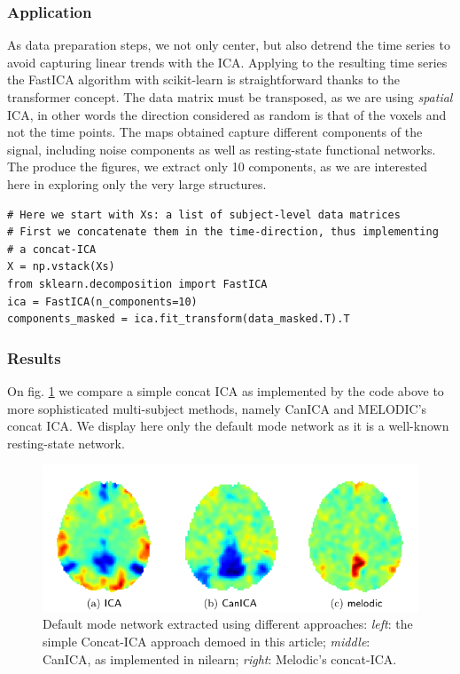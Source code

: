 \documentclass{frontiersSCNS} %
\begin{document}
\subsubsection{Application}

As data preparation steps, we not only center, but also detrend the time
series to avoid capturing linear trends with the ICA. Applying to the
resulting time series the FastICA algorithm with scikit-learn is
straightforward thanks to the transformer concept. The data matrix must
be transposed, as we are using \emph{spatial} ICA, in other words the
direction considered as random is that of the voxels and not the time
points. The maps obtained capture different components of the signal,
including noise components as well as resting-state functional networks.
The produce the figures, we extract only 10 components, as we are
interested here in exploring only the very large structures.

\begin{lstlisting}
# Here we start with Xs: a list of subject-level data matrices
# First we concatenate them in the time-direction, thus implementing
# a concat-ICA
X = np.vstack(Xs)
from sklearn.decomposition import FastICA
ica = FastICA(n_components=10)
components_masked = ica.fit_transform(data_masked.T).T
\end{lstlisting}

\subsubsection{Results}

On fig. \ref{fig:ica} we compare a simple concat ICA as implemented by
the code above to more sophisticated multi-subject methods, namely CanICA
and MELODIC's concat ICA. We display here only the default mode network
as it is a well-known resting-state network.

\begin{figure}[hbtp]
  \centerline{\includegraphics[width=.9\linewidth]{img/ica/figure}}
  \caption{Default mode network extracted using different approaches:
\emph{left}: the simple Concat-ICA approach demoed in this article;
\emph{middle}: CanICA, as implemented in nilearn; \emph{right}: Melodic's
concat-ICA.}
  \label{fig:ica}
\end{figure}
\end{document}

